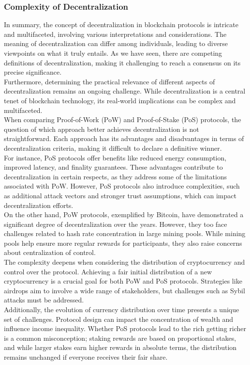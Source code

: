 \subsubsection{Complexity of Decentralization}
In summary, the concept of decentralization in blockchain protocols is intricate and multifaceted, involving various interpretations and considerations. The meaning of decentralization can differ among individuals, leading to diverse viewpoints on what it truly entails. As we have seen, there are competing definitions of decentralization, making it challenging to reach a consensus on its precise significance.\\
Furthermore, determining the practical relevance of different aspects of decentralization remains an ongoing challenge. While decentralization is a central tenet of blockchain technology, its real-world implications can be complex and multifaceted.\\
When comparing Proof-of-Work (PoW) and Proof-of-Stake (PoS) protocols, the question of which approach better achieves decentralization is not straightforward. Each approach has its advantages and disadvantages in terms of decentralization criteria, making it difficult to declare a definitive winner.\\
For instance, PoS protocols offer benefits like reduced energy consumption, improved latency, and finality guarantees. These advantages contribute to decentralization in certain respects, as they address some of the limitations associated with PoW. However, PoS protocols also introduce complexities, such as additional attack vectors and stronger trust assumptions, which can impact decentralization efforts.\\
On the other hand, PoW protocols, exemplified by Bitcoin, have demonstrated a significant degree of decentralization over the years. However, they too face challenges related to hash rate concentration in large mining pools. While mining pools help ensure more regular rewards for participants, they also raise concerns about centralization of control.\\
The complexity deepens when considering the distribution of cryptocurrency and control over the protocol. Achieving a fair initial distribution of a new cryptocurrency is a crucial goal for both PoW and PoS protocols. Strategies like airdrops aim to involve a wide range of stakeholders, but challenges such as Sybil attacks must be addressed.\\
Additionally, the evolution of currency distribution over time presents a unique set of challenges. Protocol design can impact the concentration of wealth and influence income inequality. Whether PoS protocols lead to the rich getting richer is a common misconception; staking rewards are based on proportional stakes, and while larger stakes earn higher rewards in absolute terms, the distribution remains unchanged if everyone receives their fair share.\\
